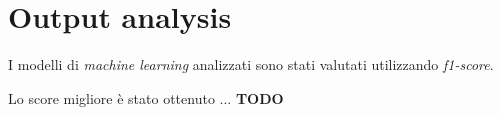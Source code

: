 \section{Output analysis}

        I modelli di \textit{machine learning} analizzati sono stati valutati utilizzando \textit{f1-score}.
        \bigbreak
        
        Lo score migliore è stato ottenuto ... \textbf{TODO}
